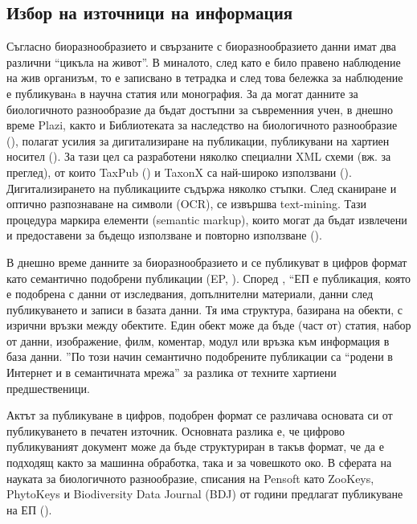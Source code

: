 \subsection*{Избор на източници на информация}

Съгласно \cite{noauthor_pro-ibiosphere_2014} биоразнообразието и свързаните с биоразнообразието данни имат два различни ``цикъла на живот''. В миналото, след като е било правено наблюдение на жив организъм, то е записвано в тетрадка и след това бележка за наблюдение е публикуванa в научна статия или монография. За да могат данните за биологичното разнообразие да бъдат достъпни за съвременния учен, в днешно време Plazi, както и Библиотеката за наследство на биологичното разнообразие (\cite {miller_taxonomic_2012}), полагат усилия за дигитализиране на публикации, публикувани на хартиен носител (\cite{agosti_why_2007}). За тази цел са разработени няколко специални XML схеми (вж. \cite {penev_xml_2011} за преглед), от които TaxPub (\cite {catapano_taxpub:_2010}) и TaxonX са най-широко използвани (\cite{penev_implementation_2012}). Дигитализирането на публикациите съдържа няколко стъпки. След сканиране и оптично разпознаване на символи (OCR), се извършва text-mining. Тази процедура маркира елементи (semantic markup), които могат да бъдат извлечени и предоставени за бъдещо използване и повторно използване (\cite{miller_integrating_2015}).

В днешно време данните за биоразнообразието и се публикуват в цифров формат като семантично подобрени публикации (EP, \cite{claerbout_electronic_1992, godtsenhoven_van_emerging_2009, shotton_semantic_2009}). Според \cite{claerbout_electronic_1992}, ``ЕП е публикация, която е подобрена с данни от изследвания, допълнителни материали, данни след публикуването и записи в базата данни. Тя има структура, базирана на обекти, с изрични връзки между обектите. Един обект може да бъде (част от) статия, набор от данни, изображение, филм, коментар, модул или връзка към информация в база данни. ''По този начин семантично подобрените публикации са ``родени в Интернет и в семантичната мрежа'' за разлика от техните хартиени предшественици.

Актът за публикуване в цифров, подобрен формат се различава основата си от публикуването в печатен източник. Основната разлика е, че цифрово публикуваният документ може да бъде структуриран в такъв формат, че да е подходящ както за машинна обработка, така и за човешкото око. В сферата на науката за биологичното разнообразие, списания на Pensoft като ZooKeys, PhytoKeys и Biodiversity Data Journal (BDJ) от години предлагат публикуване на ЕП (\cite{penev_semantic_2010}).

